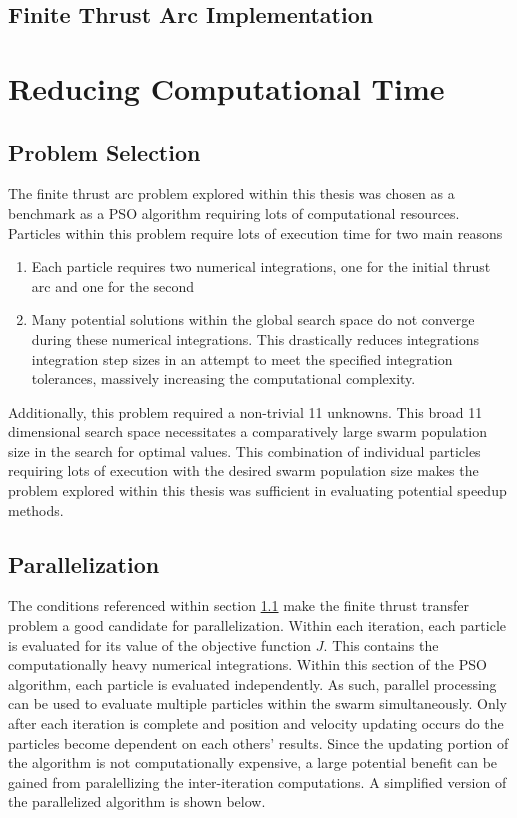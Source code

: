 \subsection{Finite Thrust Arc Implementation}

\section{Reducing Computational Time}

\subsection{Problem Selection} \label{problemSelection}
The finite thrust arc problem explored within this thesis was chosen as a benchmark as a PSO algorithm requiring 
lots of computational resources. Particles within this problem require lots of execution time for two main reasons

\begin{enumerate}
    \item Each particle requires two numerical integrations, one for the initial thrust arc and one for the second
    \item Many potential solutions within the global search space do not converge during these numerical integrations. This drastically reduces integrations
    integration step sizes in an attempt to meet the specified integration tolerances, massively increasing the computational complexity. 
\end{enumerate}

Additionally, this problem required a non-trivial 11 unknowns. This broad 11 dimensional search space necessitates a comparatively large swarm population size
in the search for optimal values. This combination of individual particles requiring lots of execution with the desired swarm population size makes the problem explored within this thesis
was sufficient in evaluating potential speedup methods.

\subsection{Parallelization}

The conditions referenced within section \ref{problemSelection} make the finite thrust transfer problem a good candidate for parallelization.
Within each iteration, each particle is evaluated for its value of the objective function $J$. This  contains the computationally heavy numerical integrations. Within this section of the PSO algorithm, each particle is evaluated independently. 
As such, parallel processing can be used to evaluate multiple particles within the swarm simultaneously. Only after each iteration is complete and position and velocity updating occurs do the particles become dependent on each others' results. Since 
the updating portion of the algorithm is not computationally expensive, a large potential benefit can be gained from paralellizing the inter-iteration computations. A simplified version of the parallelized algorithm is shown below.

